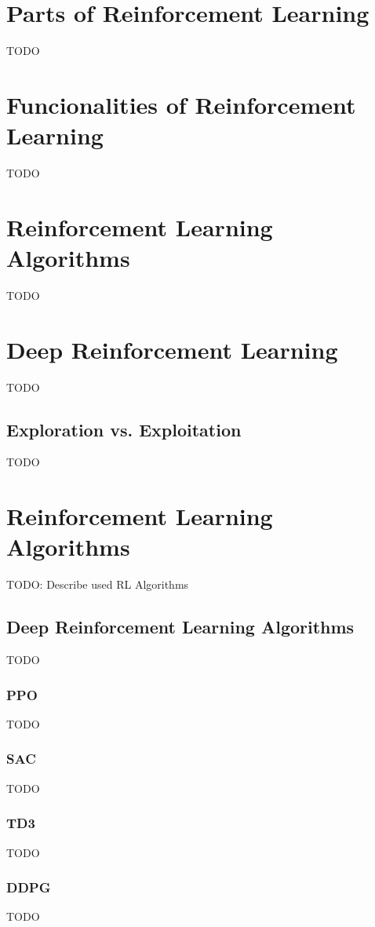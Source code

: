 \section{Parts of Reinforcement Learning}
TODO


\section{Funcionalities of Reinforcement Learning}
TODO


\section{Reinforcement Learning Algorithms}
TODO


\section{Deep Reinforcement Learning}
TODO

\subsection{Exploration vs. Exploitation}
TODO


\section{Reinforcement Learning Algorithms}
TODO: Describe used RL Algorithms

\subsection{Deep Reinforcement Learning Algorithms}
TODO

\subsubsection{PPO}
TODO

\subsubsection{SAC}
TODO

\subsubsection{TD3}
TODO

\subsubsection{DDPG}
TODO


